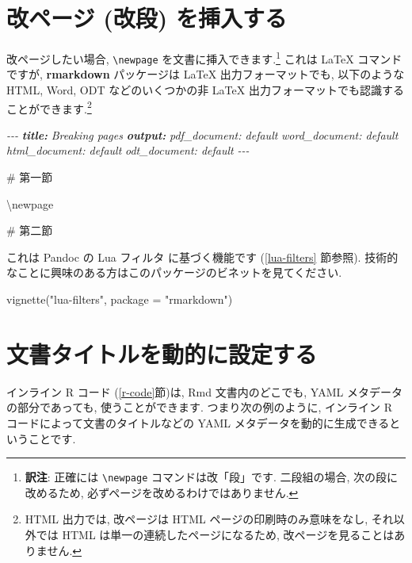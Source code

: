 \documentclass[
  11pt,
  lualatex,ja=standard,jafont=noto]{bxjsreport}
\newenvironment{Shaded}{\begin{snugshade}}{\end{snugshade}}
\newcommand{\AnnotationTok}[1]{\textcolor[rgb]{0.56,0.35,0.01}{\textbf{\textit{#1}}}}
\newcommand{\AttributeTok}[1]{\textcolor[rgb]{0.77,0.63,0.00}{#1}}
\newcommand{\CommentTok}[1]{\textcolor[rgb]{0.56,0.35,0.01}{\textit{#1}}}
\newcommand{\FunctionTok}[1]{\textcolor[rgb]{0.00,0.00,0.00}{#1}}
\newcommand{\NormalTok}[1]{#1}
\newcommand{\StringTok}[1]{\textcolor[rgb]{0.31,0.60,0.02}{#1}}
\begin{document}
\hypertarget{pagebreaks}{%
\section{改ページ (改段) を挿入する}\label{pagebreaks}}

改ページしたい場合, \texttt{\textbackslash{}newpage} を文書に挿入できます.\footnote{\textbf{訳注}: 正確には \texttt{\textbackslash{}newpage} コマンドは改「段」です. 二段組の場合, 次の段に改めるため, 必ずページを改めるわけではありません.} これは LaTeX コマンドですが, \textbf{rmarkdown} パッケージは LaTeX 出力フォーマットでも, 以下のような HTML, Word, ODT などのいくつかの非 LaTeX 出力フォーマットでも認識することができます.\footnote{HTML 出力では, 改ページは HTML ページの印刷時のみ意味をなし, それ以外では HTML は単一の連続したページになるため, 改ページを見ることはありません.}

\begin{Shaded}
\begin{Highlighting}[]
\CommentTok{{-}{-}{-}}
\AnnotationTok{title:}\CommentTok{ Breaking pages}
\AnnotationTok{output:}
\CommentTok{  pdf\_document: default}
\CommentTok{  word\_document: default}
\CommentTok{  html\_document: default}
\CommentTok{  odt\_document: default}
\CommentTok{{-}{-}{-}}

\FunctionTok{\# 第一節}

\NormalTok{\textbackslash{}newpage}

\FunctionTok{\# 第二節}
\end{Highlighting}
\end{Shaded}

これは Pandoc の Lua フィルタ に基づく機能です (\ref{lua-filters} 節参照). 技術的なことに興味のある方はこのパッケージのビネットを見てください.

\begin{Shaded}
\begin{Highlighting}[]
\FunctionTok{vignette}\NormalTok{(}\StringTok{"lua{-}filters"}\NormalTok{, }\AttributeTok{package =} \StringTok{"rmarkdown"}\NormalTok{)}
\end{Highlighting}
\end{Shaded}

\hypertarget{dynamic-yaml}{%
\section{文書タイトルを動的に設定する}\label{dynamic-yaml}}

インライン R コード (\ref{r-code}節)は, Rmd 文書内のどこでも, YAML メタデータの部分であっても, 使うことができます. つまり次の例のように, インライン R コードによって文書のタイトルなどの YAML メタデータを動的に生成できるということです.
\end{document}
